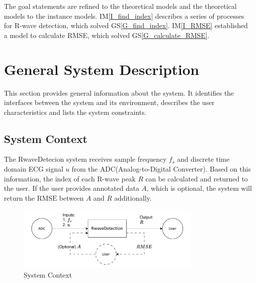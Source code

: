 \documentclass[12pt]{article}
\newcommand{\gsref}[1]{GS\ref{#1}} \newcounter{instnum} %
\newcommand{\iref}[1]{IM\ref{#1}} \newcounter{reqnum} %
\begin{document}
The goal statements are refined to the theoretical models and the theoretical
models to the instance models.  \iref{I_find_index} describes a series of
processes for R-wave detection, which solved \gsref{G_find_index}.
\iref{I_RMSE} established a model to calculate RMSE, which solved
\gsref{G_calculate_RMSE}.

\section{General System Description}

This section provides general information about the system.  It identifies the
interfaces between the system and its environment, describes the user
characteristics and lists the system constraints.

\subsection{System Context}

The RwaveDetecion system receives sample frequency $f_s$ and discrete time
domain ECG signal $u$ from the ADC(Analog-to-Digital Converter).  Based on this
information, the index of each R-wave peak $R$ can be calculated and returned to
the user.  If the user provides annotated data $A$, which is optional, the
system will return the $\text{RMSE}$ between $A$ and $R$ additionally.

\begin{figure}[h!]
\begin{center}
 \includegraphics[width=0.8\textwidth]{SystemContextFigure}
\caption{System Context}
\label{Fig_SystemContext} 
\end{center}
\end{figure}
\end{document}
